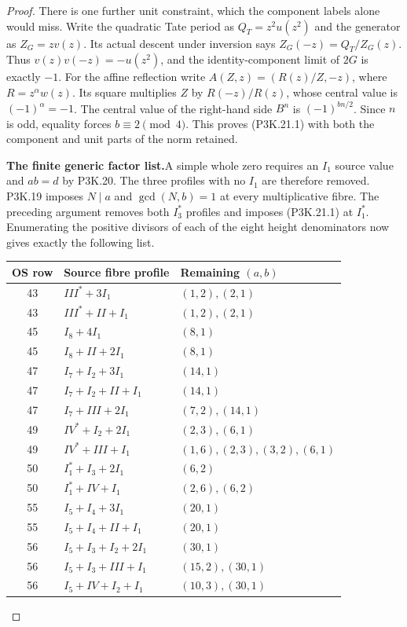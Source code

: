 \begin{proof}
There is one further unit constraint, which the component
labels alone would miss.  Write the quadratic Tate period
as \(Q_T=z^2u(z^2)\) and the generator as
\(Z_G=zv(z)\).  Its actual descent under inversion says
\(Z_G(-z)=Q_T/Z_G(z)\).  Thus
\(v(z)v(-z)=-u(z^2)\), and the identity-component
limit of \(2G\) is exactly \(-1\).  For the
affine reflection write
\(A(Z,z)=(R(z)/Z,-z)\), where
\(R=z^\alpha w(z)\).  Its square multiplies
\(Z\) by \(R(-z)/R(z)\), whose central value is
\((-1)^\alpha=-1\).  The central value of the
right-hand side \(B^n\) is
\((-1)^{bn/2}\).  Since \(n\) is odd, equality
forces \(b\equiv2\pmod4\).  This proves (P3K.21.1)
with both the component and unit parts of the norm retained.

\par\medskip\noindent\textbf{The finite generic factor list.}\enspace A simple whole
zero requires an \(I_1\) source value and \(ab=d\)
by P3K.20.  The three profiles with no \(I_1\) are
therefore removed.  P3K.19 imposes \(N\mid a\)
and \(\gcd(N,b)=1\) at every multiplicative fibre.
The preceding argument removes both \(I_3^*\) profiles
and imposes (P3K.21.1) at \(I_1^*\).  Enumerating the
positive divisors of each of the eight height denominators
now gives exactly the following list.


\begin{center}\small\begin{tabular}{c l l}\hline
OS row & Source fibre profile & Remaining \((a,b)\) \\
\hline
43 & \(III^*+3I_1\) & \((1,2),(2,1)\) \\
43 & \(III^*+II+I_1\) & \((1,2),(2,1)\) \\
45 & \(I_8+4I_1\) & \((8,1)\) \\
45 & \(I_8+II+2I_1\) & \((8,1)\) \\
47 & \(I_7+I_2+3I_1\) & \((14,1)\) \\
47 & \(I_7+I_2+II+I_1\) & \((14,1)\) \\
47 & \(I_7+III+2I_1\) & \((7,2),(14,1)\) \\
49 & \(IV^*+I_2+2I_1\) & \((2,3),(6,1)\) \\
49 & \(IV^*+III+I_1\) & \((1,6),(2,3),(3,2),(6,1)\) \\
50 & \(I_1^*+I_3+2I_1\) & \((6,2)\) \\
50 & \(I_1^*+IV+I_1\) & \((2,6),(6,2)\) \\
55 & \(I_5+I_4+3I_1\) & \((20,1)\) \\
55 & \(I_5+I_4+II+I_1\) & \((20,1)\) \\
56 & \(I_5+I_3+I_2+2I_1\) & \((30,1)\) \\
56 & \(I_5+I_3+III+I_1\) & \((15,2),(30,1)\) \\
56 & \(I_5+IV+I_2+I_1\) & \((10,3),(30,1)\) \\
\hline\end{tabular}\end{center}


\end{proof}
